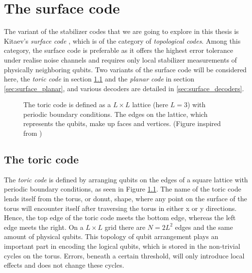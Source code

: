 

\chapter{The surface code}

The variant of the stabilizer codes that we are going to explore in this thesis is Kitaev's \emph{surface code} \cite{kitaev2003fault}, which is of the category of \emph{topological codes}. Among this category, the surface code is preferable as it offers the highest error tolerance under realise noise channels and requires only local stabilizer measurements of physically neighboring qubits. Two variants of the surface code will be considered here, the \emph{toric code} in section \ref{sec:surface_toric} and the \emph{planar code} in section \ref{sec:surface_planar}, and various decoders are detailed in \ref{sec:surface_decoders}.
\begin{figure}[b]
  \centering
  \caption{The toric code is defined as a $L\times L$ lattice (here $L=3$) with periodic boundary conditions. The edges on the lattice, which represents the qubits, make up faces and vertices. (Figure inspired from \cite{browne})}\label{sf:fig_toriclattice}
\end{figure}

\section{The toric code}\label{sec:surface_toric}
The \emph{toric code} is defined by arranging qubits on the edges of a square lattice with periodic boundary conditions, as seen in Figure \ref{sf:fig_toriclattice}. The name of the toric code lends itself from the torus, or donut, shape, where any point on the surface of the torus will encounter itself after traversing the torus in either x or y directions. Hence, the top edge of the toric code meets the bottom edge, whereas the left edge meets the right. On a $L\times L$ grid there are $N = 2L^2$ edges and the same amount of physical qubits. This topology of qubit arrangement plays an important part in encoding the logical qubits, which is stored in the non-trivial cycles on the torus. Errors, beneath a certain threshold, will only introduce local effects and does not change these cycles.

